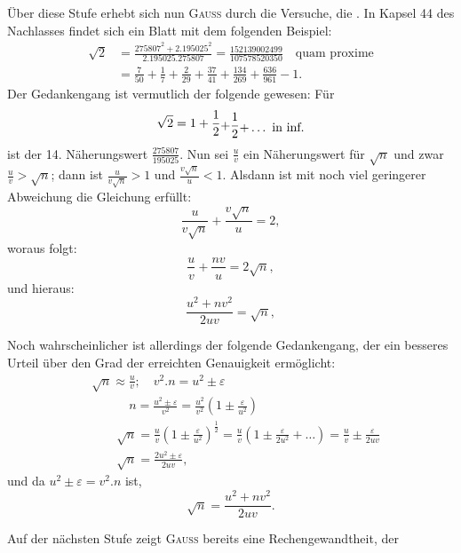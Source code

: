 Über diese Stufe erhebt sich nun \textsc{Gauss} durch die Versuche, die . In Kapsel 44 des Nachlasses findet sich ein
Blatt mit dem folgenden Beispiel:
\[
\begin{aligned}
\sqrt{2}&=\frac{275807^2+2\mathord{.}195025^2}{2\mathord{.}195025\mathord{.}275807}=\frac{152139002499}{107578520350}\quad\text{quam proxime}\\
&=\frac{7}{50}+\frac{1}{7}+\frac{2}{29}+\frac{37}{41}+\frac{134}{269}+\frac{636}{961}-1.
\end{aligned}
\]
\clearpage{}
\noindent Der Gedankengang ist vermutlich der folgende gewesen: Für
\[
\sqrt{2}=1+\frac{1}{2}\MDown{-.4ex}{+\frac{1}{2}}\MDown{-.8ex}{+\ldots\ \text{in inf.}}
\]
\noindent ist der 14. Näherungswert $\frac{275807}{195025}$. Nun sei $\frac{u}{v}$ ein Näherungswert für $\sqrt{n}$ und
zwar $\frac{u}{v}>\sqrt{n}$; dann ist $\frac{u}{v\sqrt{n}}>1$ und $\frac{v\sqrt{n}}{u}<1$. Alsdann ist mit noch viel
geringerer Abweichung die Gleichung erfüllt:
\[
\frac{u}{v\sqrt{n}}+\frac{v\sqrt{n}}{u}=2,
\]
\noindent woraus folgt:
\[
\frac{u}{v}+\frac{nv}{u}=2\sqrt{n},
\]
\noindent und hieraus:
\[
\frac{u^2+nv^2}{2uv}=\sqrt{n},
\]
\par\noindent\hspace*{\parindent}Noch wahrscheinlicher ist allerdings der folgende Gedankengang, der ein
besseres Urteil über den Grad der erreichten Genauigkeit ermöglicht:
\[
\begin{aligned}
&\sqrt{n}\approx\frac{u}{v};\quad v^2\mathord{.}n=u^2\pm\varepsilon\\
&\hspace{3em}n=\frac{u^2\pm\varepsilon}{v^2}=\frac{u^2}{v^2}\left(1\pm\frac{\varepsilon}{u^2}\right)\\
&\hspace{2em}\sqrt{n}=\frac{u}{v}\left(1\pm\frac{\varepsilon}{u^2}\right)^{\frac12}=\frac{u}{v}\left(1\pm\frac{\varepsilon}{2u^2}+\ldots\right)=\frac{u}{v}\pm\frac{\varepsilon}{2uv}\\
&\hspace{2em}\sqrt{n}=\frac{2u^2\pm\varepsilon}{2uv},
\end{aligned}
\]
\noindent und da $u^2\pm\varepsilon=v^2\mathord{.}n$ ist,
\[
\sqrt{n}=\frac{u^2+nv^2}{2uv}.
\]
\par\noindent\hspace*{\parindent}Auf der nächsten Stufe zeigt \textsc{Gauss} bereits eine Rechengewandtheit, der
